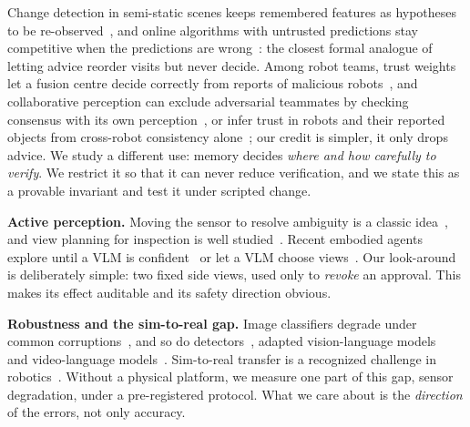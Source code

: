 \documentclass[conference]{IEEEtran}
\begin{document}
Change detection in semi-static scenes keeps remembered features as hypotheses to be re-observed~\cite{saavedraruiz2025perpetua}, and online algorithms with untrusted predictions stay competitive when the predictions are wrong~\cite{antoniadis2023online}: the closest formal analogue of letting advice reorder visits but never decide. Among robot teams, trust weights let a fusion centre decide correctly from reports of malicious robots~\cite{cavorsi2022trust}, and collaborative perception can exclude adversarial teammates by checking consensus with its own perception~\cite{li2023robosac}, or infer trust in robots and their reported objects from cross-robot consistency alone~\cite{wang2026nestbayes}; our credit is simpler, it only drops advice.
We study a different use: memory decides \emph{where and how carefully to verify}. We restrict it so that it can never
reduce verification, and we state this as a provable invariant and test it under scripted change.

\textbf{Active perception.} Moving the sensor to resolve ambiguity is a classic idea~\cite{bajcsy1988active,bajcsy2018revisiting},
and view planning for inspection is well studied~\cite{scott2003viewplanning}. Recent embodied agents explore until a VLM
is confident~\cite{ren2024exploreuntil} or let a VLM choose views~\cite{sripada2024sceneexploration}. Our look-around is
deliberately simple: two fixed side views, used only to \emph{revoke} an approval. This makes its effect auditable and
its safety direction obvious.

\textbf{Robustness and the sim-to-real gap.} Image classifiers degrade under common corruptions~\cite{hendrycks2019benchmarking}, and so do detectors~\cite{michaelis2019benchmarking}, adapted vision-language models~\cite{chen2023benchmarking} and video-language models~\cite{schiappa2022robustness}. Sim-to-real transfer is a recognized challenge in robotics~\cite{hofer2021sim2real}.
Without a physical platform, we measure one part of this gap, sensor degradation, under a pre-registered protocol. What
we care about is the \emph{direction} of the errors, not only accuracy.
\end{document}
